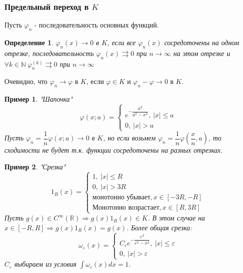 \documentclass[9pt, a4paper]{article}
\newtheorem*{definition}{Определение}
\newtheorem*{sample}{Пример}
\begin{document}
		\subsubsection{Предельный переход в $K$}
			Пусть $\varphi_n$ - последовательность основных функций.
			\begin{definition}
				$\varphi_n(x) \to 0$ в $K$, если все $\varphi_n(x)$ сосредоточены на одном отрезке, последовательность $\varphi_n(x) \rightrightarrows 0$ при $n \to \infty$ на этом отрезке и $\forall k \in \mathbb{N}\ \varphi_n^{(k)} \rightrightarrows 0$ при $n \to \infty$  
			\end{definition}
			Очевидно, что $\varphi_n \to \varphi$ в $K$, если $ \varphi \in K$ и  $\varphi_n - \varphi \to 0$ в $K$.
			\begin{sample}
				"Шапочка"\newline
				\begin{equation*}
					\varphi(x; a) = \begin{cases}
						e^{-\dfrac{a^2}{a^2 - x^2}}, \ |x| \leq a \\
						0, \ |x| > a
					\end{cases}
				\end{equation*}
				Пусть $\varphi_n = \dfrac1{n} \varphi(x;a) \to 0 $ в $K$, но если возьмем $\varphi_n = \dfrac{1}{n} \varphi(\dfrac{x}{n}, a)$, то сходимости не будет т.к. функции сосредоточены на разных отрезках.
			\end{sample}
			\begin{sample}
				"Срезка"\newline
				\begin{equation*}
					1_R(x) = \begin{cases}
						1, \ |x| \leq R\\
						0, \ |x| > 3R \\
						\text{монотонно убывает}, x \in [-3R, -R] \\
						\text{Монотонно возрастает}, x \in [R, 3R]
					\end{cases}
				\end{equation*}
				Пусть $g(x) \in C^\infty(\mathbb{R}) \Rightarrow g(x)1_R(x) \in K$. В этом случае на $x \in [-R, R] \Rightarrow g(x)1_R(x) = g(x)$.\newline
				Более общая срезка:
				\begin{equation*}
					\omega_\varepsilon(x) = \begin{cases}
						C_\varepsilon e^{-\dfrac{\varepsilon^2}{\varepsilon^2 - x^2}}, \ |x| \leq \varepsilon \\
						0, \ |x| > \varepsilon
					\end{cases}
				\end{equation*}
				$C_\varepsilon$ выбираем из условия $\int \omega_\varepsilon(x) dx = 1$.
			\end{sample}
\end{document}

